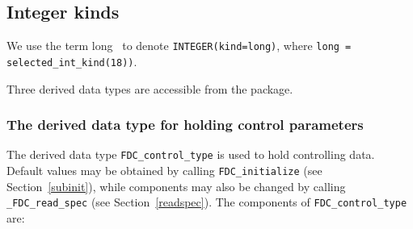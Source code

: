 \documentclass{galahad}
\newcommand{\packagename}{FDC}
\newcommand{\fullpackagename}{\libraryname\_\-\packagename}
\begin{document}

\subsection{Integer kinds}\label{Integer kinds}
We use the term
long \integer\ to denote {\tt INTEGER\-(kind=long)}, where
{\tt long = selected\_int\_kind(18))}.





\galtypes
Three derived data types are accessible from the package.


\subsubsection{The derived data type for holding control
 parameters}\label{typecontrol}
The derived data type
{\tt \packagename\_control\_type}
is used to hold controlling data. Default values may be obtained by calling
{\tt \packagename\_initialize}
(see Section~\ref{subinit}),
while components may also be changed by calling
{\tt \fullpackagename\_read\-\_spec}
(see Section~\ref{readspec}).
The components of
{\tt \packagename\_control\_type}
are:
\end{document}
